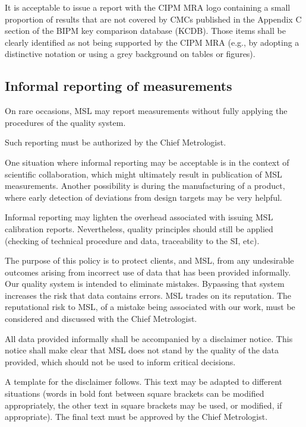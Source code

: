 It is acceptable to issue a report with the CIPM MRA logo containing a small proportion of results that are not covered by CMCs published in the Appendix C section of the BIPM key comparison database (KCDB). Those items shall be clearly identified as not being supported by the CIPM MRA (e.g., by adopting a distinctive notation or using a grey background on tables or figures).

\subsection{Informal reporting of measurements}
 \label{ss:informal_reporting}
On rare occasions, MSL may report measurements without fully applying the procedures of the quality system. 

Such reporting must be authorized by the Chief Metrologist.

One situation where informal reporting may be acceptable is in the context of scientific collaboration, which might ultimately result in publication of MSL measurements. Another possibility is during the manufacturing of a product, where early detection of deviations from design targets may be very helpful.

Informal reporting may lighten the overhead associated with issuing MSL calibration reports. Nevertheless, quality principles should still be applied (checking of technical procedure and data, traceability to the SI, etc).

The purpose of this policy is to protect clients, and MSL, from any undesirable outcomes arising from incorrect use of data that has been provided informally. Our quality system is intended to eliminate mistakes. Bypassing that system increases the risk that data contains errors. MSL trades on its reputation. The reputational risk to MSL, of a mistake being associated with our work, must be considered and discussed with the Chief Metrologist.

All data provided informally shall be accompanied by a disclaimer notice. This notice shall make clear that MSL does not stand by the quality of the data provided, which should not be used to inform critical decisions. 

A template for the disclaimer follows. This text may be adapted to different situations (words in bold font between square brackets can be modified appropriately, the other text in square brackets may be used, or modified, if appropriate). The final text must be approved by the Chief Metrologist.


